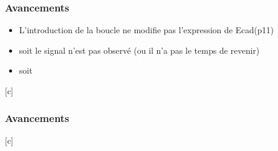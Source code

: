 \begin{frame}[c]
\frametitle{Avancements}
 
\begin{itemize}
 \item  L'introduction de la boucle ne modifie pas l'expression de Ecad(p11)
 \item soit le signal n'est pas observé (ou il n'a pas le temps de revenir)
 \item soit 
\end{itemize}


\end{frame}[c]

\begin{frame}[c]
\frametitle{Avancements}
 


\end{frame}[c]



